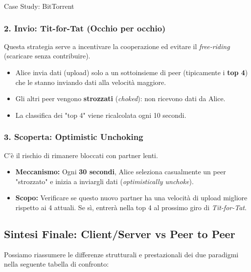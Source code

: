 \documentclass[a4paper,12pt]{report}
\begin{document}
\begin{esempiobox}{Case Study: BitTorrent}
\subsubsection*{2. Invio: Tit-for-Tat (Occhio per occhio)}
Questa strategia serve a incentivare la cooperazione ed evitare il \textit{free-riding} (scaricare senza contribuire).
\begin{itemize}
    \item Alice invia dati (upload) solo a un sottoinsieme di peer (tipicamente i \textbf{top 4}) che le stanno inviando dati alla velocità maggiore.
    \item Gli altri peer vengono \textbf{strozzati} (\textit{choked}): non ricevono dati da Alice.
    \item La classifica dei "top 4" viene ricalcolata ogni 10 secondi.
\end{itemize}

\subsubsection*{3. Scoperta: Optimistic Unchoking}
C'è il rischio di rimanere bloccati con partner lenti.
\begin{itemize}
    \item \textbf{Meccanismo:} Ogni \textbf{30 secondi}, Alice seleziona casualmente un peer "strozzato" e inizia a inviargli dati (\textit{optimistically unchoke}).
    \item \textbf{Scopo:} Verificare se questo nuovo partner ha una velocità di upload migliore rispetto ai 4 attuali. Se sì, entrerà nella top 4 al prossimo giro di \textit{Tit-for-Tat}.
\end{itemize}

\end{esempiobox}

\vspace{1cm}

\subsection*{Sintesi Finale: Client/Server vs Peer to Peer}

Possiamo riassumere le differenze strutturali e prestazionali dei due paradigmi nella seguente tabella di confronto:
\end{document}
